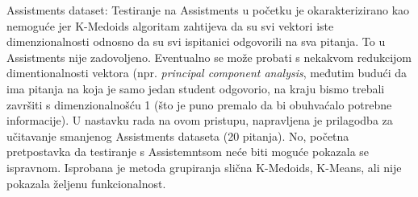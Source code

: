 \documentclass[times, utf8,projekt]{fer}
\begin{document}
Assistments dataset:\newline
Testiranje na Assistments u početku je okarakterizirano kao nemoguće jer K-Medoids algoritam zahtijeva da su svi vektori iste dimenzionalnosti odnosno da su svi ispitanici odgovorili na sva pitanja. To u Assistments nije zadovoljeno. Eventualno se može probati s nekakvom redukcijom dimentionalnosti vektora (npr. \textit{principal component analysis}, međutim budući da ima pitanja na koja je samo jedan student odgovorio, na kraju bismo trebali završiti s dimenzionalnošću 1 (što je puno premalo da bi obuhvaćalo potrebne informacije).\newline
U nastavku rada na ovom pristupu, napravljena je prilagodba za učitavanje smanjenog Assistments dataseta (20 pitanja). No, početna pretpostavka da testiranje s Assistemntsom neće biti moguće pokazala se ispravnom. Isprobana je metoda grupiranja slična K-Medoids, K-Means, ali nije pokazala željenu funkcionalnost.
\end{document}
